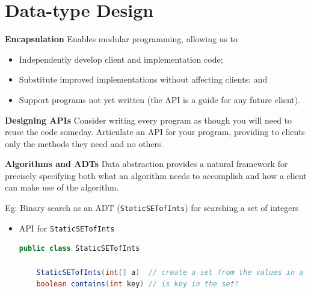 \documentclass[8pt,a4paper,compress]{beamer}
\begin{document}
\section{Data-type Design}
\begin{frame}[fragile]
\pause

\textbf{Encapsulation} Enables modular programming, allowing us to
\begin{itemize}
\item Independently develop client and implementation code; 
\item Substitute improved implementations without affecting clients; and
\item Support programs not yet written (the API is a guide for any future client).
\end{itemize}

\pause
\smallskip

\textbf{Designing APIs} Consider writing every program as though you
will need to reuse the code someday. Articulate an API for your program, providing to clients only the methods they need and no others. 

\pause
\smallskip

\textbf{Algorithms and ADTs} Data abstraction provides a natural framework for precisely specifying both what an algorithm needs to accomplish and how a client can make use of the algorithm. 

\pause
\smallskip

Eg: Binary search as an ADT (\lstinline$StaticSETofInts$) for searching a set of integers

\pause
\smallskip

\begin{itemize}
\item API for \lstinline$StaticSETofInts$
\begin{lstlisting}[language=Java]
public class StaticSETofInts

    StaticSETofInts(int[] a)  // create a set from the values in a
    boolean contains(int key) // is key in the set? 
\end{lstlisting}
\end{itemize}
\end{frame}
\end{document}
